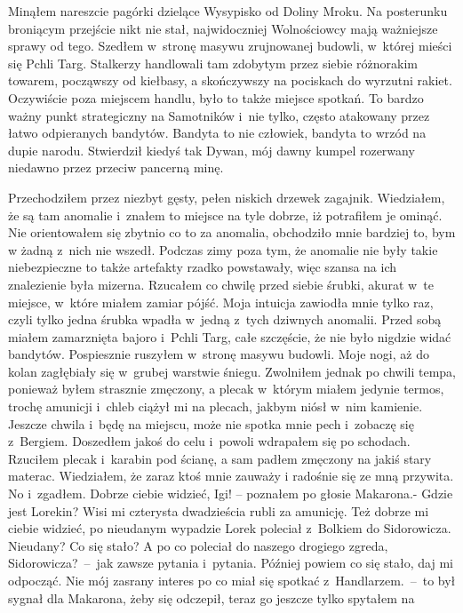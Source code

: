 \documentclass[../MAIN.tex]{subfiles}
\begin{document}
Minąłem nareszcie pagórki dzielące Wysypisko od Doliny Mroku.
Na posterunku broniącym przejście nikt nie stał, najwidoczniej
Wolnościowcy mają ważniejsze sprawy od tego. Szedłem w~stronę
masywu zrujnowanej budowli, w~której mieści się Pchli Targ.
Stalkerzy handlowali tam zdobytym przez siebie różnorakim
towarem, począwszy od kiełbasy, a skończywszy na pociskach do
wyrzutni rakiet. Oczywiście poza miejscem handlu, było to także
miejsce spotkań. To bardzo ważny punkt strategiczny na
Samotników i~nie tylko, często atakowany przez łatwo
odpieranych bandytów. Bandyta to nie człowiek, bandyta to wrzód
na dupie narodu. Stwierdził kiedyś tak Dywan, mój dawny kumpel
rozerwany niedawno przez przeciw pancerną minę.

Przechodziłem przez niezbyt gęsty, pełen niskich drzewek
zagajnik. Wiedziałem, że są tam anomalie i~znałem to miejsce na
tyle dobrze, iż potrafiłem je ominąć. Nie orientowałem się
zbytnio co to za anomalia, obchodziło mnie bardziej to, bym w
żadną z~nich nie wszedł. Podczas zimy poza tym, że anomalie nie
były takie niebezpieczne to także artefakty rzadko powstawały,
więc szansa na ich znalezienie była mizerna. Rzucałem co chwilę
przed siebie śrubki, akurat w~te miejsce, w~które miałem zamiar
pójść. Moja intuicja zawiodła mnie tylko raz, czyli tylko jedna
śrubka wpadła w~jedną z~tych dziwnych anomalii. Przed sobą
miałem zamarznięta bajoro i~Pchli Targ, całe szczęście, że nie
było nigdzie widać bandytów. Pospiesznie ruszyłem w~stronę
masywu budowli. Moje nogi, aż do kolan zagłębiały się w~grubej
warstwie śniegu. Zwolniłem jednak po chwili tempa, ponieważ
byłem strasznie zmęczony, a plecak w~którym miałem jedynie
termos, trochę amunicji i~chleb ciążył mi na plecach, jakbym
niósł w~nim kamienie. Jeszcze chwila i~będę na miejscu, może
nie spotka mnie pech i~zobaczę się z~Bergiem.
Doszedłem jakoś do celu i~powoli wdrapałem się po schodach.
Rzuciłem plecak i~karabin pod ścianę, a sam padłem zmęczony na
jakiś stary materac. Wiedziałem, że zaraz ktoś mnie zauważy i
radośnie się ze mną przywita. No i~zgadłem.
%
\sx Dobrze ciebie widzieć, Igi! – poznałem po głosie Makarona.-
Gdzie jest Lorekin? Wisi mi czterysta dwadzieścia rubli za
amunicję.
\xx Też dobrze mi ciebie widzieć, po nieudanym wypadzie Lorek
poleciał z~Bolkiem do Sidorowicza.
\xx Nieudany? Co się stało? A po co poleciał do naszego
drogiego
zgreda, Sidorowicza?~--~jak zawsze pytania i~pytania.
\xx Później powiem co się stało, daj mi odpocząć. Nie mój
zasrany
interes po co miał się spotkać z~Handlarzem.~--~to był sygnał
dla
Makarona, żeby się odczepił, teraz go jeszcze tylko spytałem na
\end{document}
